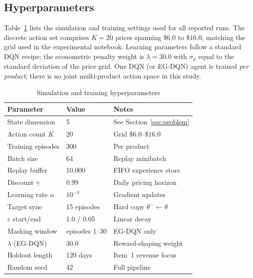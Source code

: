 \documentclass[journal, 10pt, twoside]{IEEEtran}
\begin{document}
\subsection{Hyperparameters}

Table~\ref{tab:hyperparams} lists the simulation and training settings
used for all reported runs.
The discrete action set comprises $K=20$ prices spanning $\$6.0$ to
$\$16.0$, matching the grid used in the experimental notebook.
Learning parameters follow a standard DQN recipe; the econometric
penalty weight is $\lambda=30.0$ with $\sigma_p$ equal to the standard
deviation of the price grid.
One DQN (or EG-DQN) agent is trained \emph{per product}; there is no
joint multi-product action space in this study.

\begin{table}[H]
\centering
\caption{Simulation and training hyperparameters}
\label{tab:hyperparams}
\begin{tabular}{lll}
\toprule
\textbf{Parameter} & \textbf{Value} & \textbf{Notes} \\
\midrule
State dimension           & 5              & See Section~\ref{sec:problem} \\
Action count $K$          & 20             & Grid $\$6.0$--$\$16.0$ \\
Training episodes         & 300            & Per product \\
Batch size                & 64             & Replay minibatch \\
Replay buffer             & 10{,}000       & FIFO experience store \\
Discount $\gamma$         & 0.99           & Daily pricing horizon \\
Learning rate $\alpha$    & $10^{-3}$      & Gradient updates \\
Target sync               & 15 episodes    & Hard copy $\theta^- \gets \theta$ \\
$\varepsilon$ start/end   & 1.0 / 0.05     & Linear decay \\
Masking window            & episodes 1--30 & EG-DQN only \\
$\lambda$ (EG-DQN)        & 30.0           & Reward-shaping weight \\
Holdout length            & 120 days       & Item~1 revenue focus \\
Random seed               & 42             & Full pipeline \\
\bottomrule
\end{tabular}
\end{table}
\end{document}

